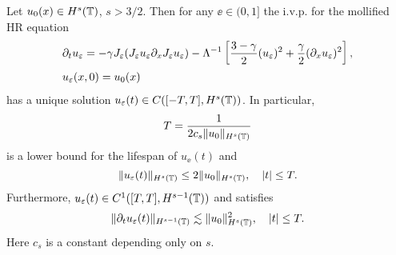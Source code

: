 %
%
\begin{lemma}
\label{hr_wp}
Let  $u_0(x) \in  H^s(\mathbb{T})$, $s >3/2$. Then for any $\ee\in (0, 1]$
the i.v.p. for the mollified HR equation 
%
%
%
\begin{align} \label{hr-moli-2}
& \partial_t  u_\varepsilon =
-\gamma J_\varepsilon (J_\varepsilon u_\varepsilon \partial_x  J_\varepsilon  u_\varepsilon) - \Lambda^{-1} \left
[\frac{3-\gamma}{2}(u_\varepsilon)^2 + \frac{\gamma}{2}(\partial_x u_\varepsilon)^2
\right ], 
\\
&  u_\varepsilon(x, 0) = u_0 (x)
\label{burgers-moli-data-2}
\end{align}
%
% 
%
%
%
%
%
%
has a unique solution $u_\varepsilon( t)\in C([-T, T], H^s(\mathbb{T}))$.  In particular,
%
%
%
\begin{equation} \label{life-est}
T
=
\frac{1}{ 2 c_s \|u_0\|_{H^s(\mathbb{T})}}
\end{equation}
%
%
%
is a lower bound for the lifespan of $u_\ee( t)$ and
%
%
%
\begin{equation}
\label{u-e-Hs-bound}
\|u_\varepsilon(t)\|_{H^s(\mathbb{T})}
\le
2 \|u_0 \|_{H^s(\mathbb{T})},
\quad
|t| \le T.
\end{equation}
%
%
%
Furthermore,  $u_\varepsilon( t)\in C^1([T, T], H^{s-1}(\mathbb{T}))$ and satisfies
%
%
\begin{equation}
\label{dt-u-e-Hs-bound}
\|\partial_t u_\varepsilon(t)\|_{H^{s-1}(\mathbb{T})}
\lesssim
\|u_0 \|_{H^s(\mathbb{T})}^2,
\quad
|t| \le T.
\end{equation}
%
%
% 
Here  $c_s$ is a constant depending only on $s$.
\end{lemma}
%
%
%
%

